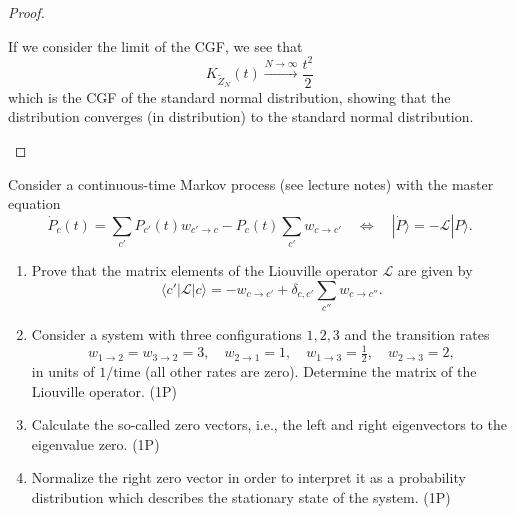 \begin{proof}
\begin{parts}
If we consider the limit of the CGF, we see that
\[
	K_{\tilde{Z}_N}(t) \xrightarrow{N\to\infty} \frac{t^2}{2}
\]
which is the CGF of the standard normal distribution, showing that the distribution converges (in distribution) to the standard normal distribution.\qedhere
	\end{parts}
\end{proof}
\begin{Problem}
	Consider a continuous-time Markov process (see lecture notes) with the master equation
	\[
	\dot{P}_c(t) = \sum_{c'} P_{c'}(t) w_{c' \to c} - P_c(t) \sum_{c'} w_{c \to c'}
	\quad \Longleftrightarrow \quad
	|\dot{P}\rangle = -\mathcal{L} |P\rangle.
	\]
	
	\begin{enumerate}
		\item[(a)] Prove that the matrix elements of the Liouville operator $\mathcal{L}$ are given by
		\[
		\langle c' | \mathcal{L} | c \rangle = - w_{c \to c'} + \delta_{c,c'} \sum_{c''} w_{c \to c''}.
		\]
		
		\item[(b)] Consider a system with three configurations $1,2,3$ and the transition rates
		\[
		w_{1 \to 2} = w_{3 \to 2} = 3, \quad
		w_{2 \to 1} = 1, \quad
		w_{1 \to 3} = \tfrac{1}{2}, \quad
		w_{2 \to 3} = 2,
		\]
		in units of $1/\text{time}$ (all other rates are zero). Determine the matrix of the Liouville operator. (1P)
		
		\item[(c)] Calculate the so-called zero vectors, i.e., the left and right eigenvectors to the eigenvalue zero. (1P)
		
		\item[(d)] Normalize the right zero vector in order to interpret it as a probability distribution which describes the stationary state of the system. (1P)
	\end{enumerate}
\end{Problem}
